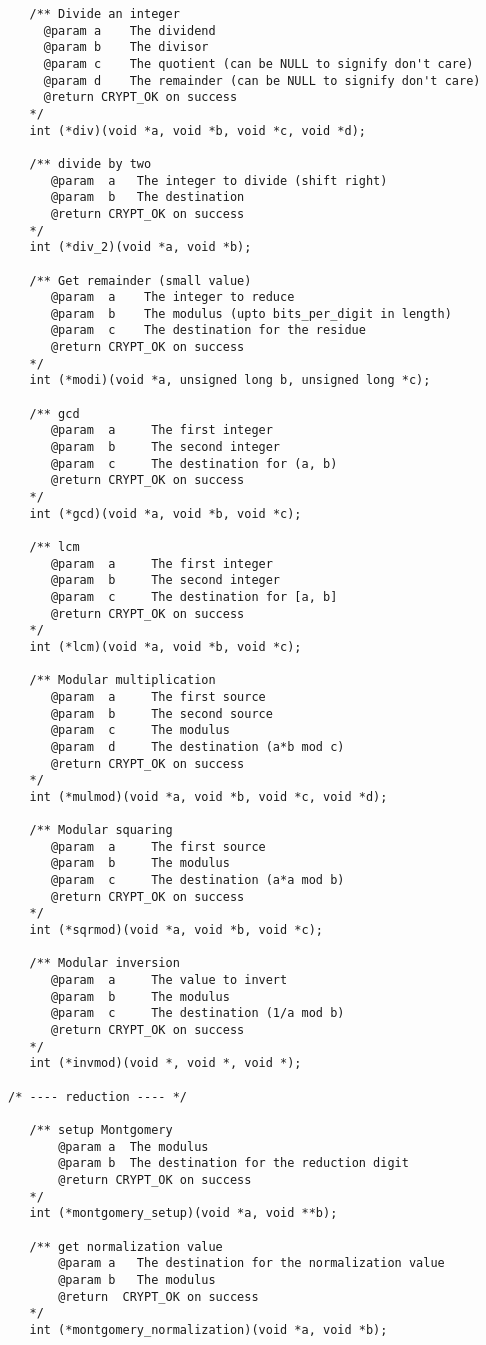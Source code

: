 \documentclass[synpaper]{book}
\begin{document}
\begin{small}
\begin{verbatim}
   /** Divide an integer
     @param a    The dividend
     @param b    The divisor
     @param c    The quotient (can be NULL to signify don't care)
     @param d    The remainder (can be NULL to signify don't care)
     @return CRYPT_OK on success
   */
   int (*div)(void *a, void *b, void *c, void *d);

   /** divide by two 
      @param  a   The integer to divide (shift right)
      @param  b   The destination 
      @return CRYPT_OK on success
   */
   int (*div_2)(void *a, void *b);

   /** Get remainder (small value)
      @param  a    The integer to reduce
      @param  b    The modulus (upto bits_per_digit in length)
      @param  c    The destination for the residue
      @return CRYPT_OK on success
   */
   int (*modi)(void *a, unsigned long b, unsigned long *c);

   /** gcd 
      @param  a     The first integer
      @param  b     The second integer
      @param  c     The destination for (a, b)
      @return CRYPT_OK on success
   */
   int (*gcd)(void *a, void *b, void *c);

   /** lcm 
      @param  a     The first integer
      @param  b     The second integer
      @param  c     The destination for [a, b]
      @return CRYPT_OK on success
   */
   int (*lcm)(void *a, void *b, void *c);

   /** Modular multiplication
      @param  a     The first source
      @param  b     The second source 
      @param  c     The modulus
      @param  d     The destination (a*b mod c)
      @return CRYPT_OK on success
   */
   int (*mulmod)(void *a, void *b, void *c, void *d);

   /** Modular squaring
      @param  a     The first source
      @param  b     The modulus
      @param  c     The destination (a*a mod b)
      @return CRYPT_OK on success
   */
   int (*sqrmod)(void *a, void *b, void *c);

   /** Modular inversion
      @param  a     The value to invert
      @param  b     The modulus 
      @param  c     The destination (1/a mod b)
      @return CRYPT_OK on success
   */
   int (*invmod)(void *, void *, void *);

/* ---- reduction ---- */

   /** setup Montgomery
       @param a  The modulus 
       @param b  The destination for the reduction digit 
       @return CRYPT_OK on success
   */
   int (*montgomery_setup)(void *a, void **b);

   /** get normalization value 
       @param a   The destination for the normalization value
       @param b   The modulus
       @return  CRYPT_OK on success
   */
   int (*montgomery_normalization)(void *a, void *b);


\end{verbatim}
\end{small}
\end{document}
